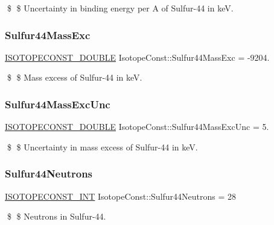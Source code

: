 \$ \$ Uncertainty in binding energy per A of Sulfur-\/44 in keV. \mbox{\label{group___isotope_const-_sulfur-_s44_gab661e340ae6752a4eba1f2cd3837d767}} 
\subsubsection{\texorpdfstring{Sulfur44\+Mass\+Exc}{Sulfur44MassExc}}
{\footnotesize\ttfamily \mbox{\hyperlink{group___isotope_const-_macros_ga8f45a7272ce02c0b4c65c44636ed719a}{I\+S\+O\+T\+O\+P\+E\+C\+O\+N\+S\+T\+\_\+\+D\+O\+U\+B\+LE}} Isotope\+Const\+::\+Sulfur44\+Mass\+Exc = -\/9204.}

\$ \$ Mass excess of Sulfur-\/44 in keV. \mbox{\label{group___isotope_const-_sulfur-_s44_ga4eb05448a88cd8fa12d362a03a87828a}} 
\subsubsection{\texorpdfstring{Sulfur44\+Mass\+Exc\+Unc}{Sulfur44MassExcUnc}}
{\footnotesize\ttfamily \mbox{\hyperlink{group___isotope_const-_macros_ga8f45a7272ce02c0b4c65c44636ed719a}{I\+S\+O\+T\+O\+P\+E\+C\+O\+N\+S\+T\+\_\+\+D\+O\+U\+B\+LE}} Isotope\+Const\+::\+Sulfur44\+Mass\+Exc\+Unc = 5.}

\$ \$ Uncertainty in mass excess of Sulfur-\/44 in keV. \mbox{\label{group___isotope_const-_sulfur-_s44_ga822e0a8903dea6e64d65beb632f076d0}} 
\subsubsection{\texorpdfstring{Sulfur44\+Neutrons}{Sulfur44Neutrons}}
{\footnotesize\ttfamily \mbox{\hyperlink{group___isotope_const-_macros_ga5f18360b3e99483a35c32d789e62621c}{I\+S\+O\+T\+O\+P\+E\+C\+O\+N\+S\+T\+\_\+\+I\+NT}} Isotope\+Const\+::\+Sulfur44\+Neutrons = 28}

\$ \$ Neutrons in Sulfur-\/44. \mbox{\label{group___isotope_const-_sulfur-_s44_gac4faeb25b560a0503c9f7f0b03f942ac}} 
